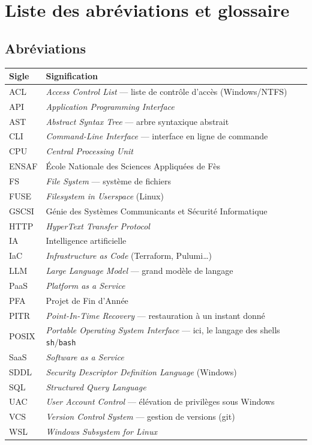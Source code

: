 \chapter*{Liste des abréviations et glossaire}

\section*{Abréviations}
\begin{longtable}{@{}L{3cm}L{11.5cm}@{}}
\toprule
\textbf{Sigle} & \textbf{Signification} \\
\midrule
\endhead
ACL & \textit{Access Control List} — liste de contrôle d'accès (Windows/NTFS) \\
API & \textit{Application Programming Interface} \\
AST & \textit{Abstract Syntax Tree} — arbre syntaxique abstrait \\
CLI & \textit{Command-Line Interface} — interface en ligne de commande \\
CPU & \textit{Central Processing Unit} \\
ENSAF & École Nationale des Sciences Appliquées de Fès \\
FS & \textit{File System} — système de fichiers \\
FUSE & \textit{Filesystem in Userspace} (Linux) \\
GSCSI & Génie des Systèmes Communicants et Sécurité Informatique \\
HTTP & \textit{HyperText Transfer Protocol} \\
IA & Intelligence artificielle \\
IaC & \textit{Infrastructure as Code} (Terraform, Pulumi\ldots) \\
LLM & \textit{Large Language Model} — grand modèle de langage \\
PaaS & \textit{Platform as a Service} \\
PFA & Projet de Fin d'Année \\
PITR & \textit{Point-In-Time Recovery} — restauration à un instant donné \\
POSIX & \textit{Portable Operating System Interface} — ici, le langage des shells \texttt{sh}/\texttt{bash} \\
SaaS & \textit{Software as a Service} \\
SDDL & \textit{Security Descriptor Definition Language} (Windows) \\
SQL & \textit{Structured Query Language} \\
UAC & \textit{User Account Control} — élévation de privilèges sous Windows \\
VCS & \textit{Version Control System} — gestion de versions (git) \\
WSL & \textit{Windows Subsystem for Linux} \\
\bottomrule
\end{longtable}

